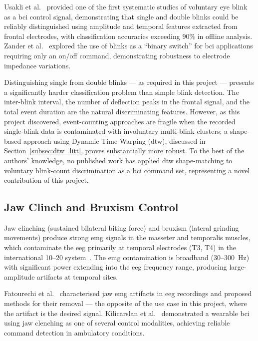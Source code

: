 Usakli et al.~\cite{usakli2010artifact} provided one of the first
systematic studies of voluntary eye blink as a \acrshort{bci}
control signal, demonstrating that single and double blinks could
be reliably distinguished using amplitude and temporal features
extracted from frontal electrodes, with classification accuracies
exceeding 90\% in offline analysis. Zander et al.~\cite{zander2011bci}
explored the use of blinks as a ``binary switch'' for \acrshort{bci}
applications requiring only an on/off command, demonstrating
robustness to electrode impedance variations.

Distinguishing single from double blinks — as required in this
project — presents a significantly harder classification problem
than simple blink detection. The inter-blink interval, the number
of deflection peaks in the frontal signal, and the total event
duration are the natural discriminating features. However, as
this project discovered, event-counting approaches are fragile when
the recorded single-blink data is contaminated with involuntary
multi-blink clusters; a shape-based approach using Dynamic Time
Warping (\acrshort{dtw}), discussed in Section~\ref{subsec:dtw_litt},
proves substantially more robust. To the best of the authors'
knowledge, no published work has applied \acrshort{dtw}
shape-matching to voluntary blink-count discrimination as a
\acrshort{bci} command set, representing a novel contribution of
this project.

\subsection{Jaw Clinch and Bruxism Control}

Jaw clinching (sustained bilateral biting force) and bruxism
(lateral grinding movements) produce strong \acrshort{emg} signals
in the masseter and temporalis muscles, which contaminate the
\acrshort{eeg} primarily at temporal electrodes (T3, T4) in the
international 10--20 system~\cite{croft2000removal}. The
\acrshort{emg} contamination is broadband (30--300~Hz) with
significant power extending into the \acrshort{eeg} frequency range,
producing large-amplitude artifacts at temporal sites.

Fatourechi et al.~\cite{fatourechi2007emg} characterised jaw
\acrshort{emg} artifacts in \acrshort{eeg} recordings and proposed
methods for their removal — the opposite of the use case in this
project, where the artifact is the desired signal. Kilicarslan
et al.~\cite{kilicarslan2016high} demonstrated a wearable
\acrshort{bci} using jaw clenching as one of several control
modalities, achieving reliable command detection in ambulatory
conditions.

